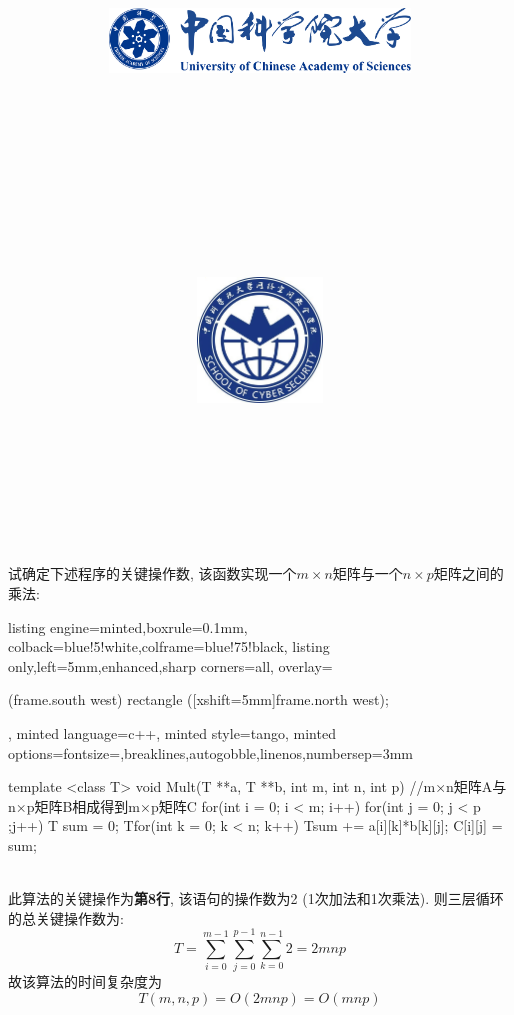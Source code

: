 \documentclass{article}
\title{
	\includegraphics[width=0.6\textwidth]{images/title/ucas_logo 1.pdf}\\
    \vspace{1in}
    \textmd{\textbf{\hmwkClass}}\\
	\textmd{\Large{\textbf{\hmwkClassID}}}\\
    \textmd{\textbf{\hmwkTitle}}\\
    \normalsize\vspace{0.1in}\large{\hmwkCompleteTime }\\
    \vspace{0.1in}\large{\textit{\hmwkClassInstructor\ }}\\
    \vspace{1in}
	\includegraphics[width=0.25\textwidth]{images/title/Cyber.jpg}\\
	\vspace{1in}
}
\author{
	\hmwkAuthorName \\ 
	\hmwkAuthorStuID \\
	\hmwkAuthorInst \\
	\hmwkAuthorzhuanye \\
	\hmwkAuthorfangxiang
	}
\date{}
\begin{document}
\maketitle


%
%
%
%
%


\pagebreak

\begin{homeworkProblem}
	试确定下述程序的关键操作数, 该函数实现一个$m\times n$矩阵与一个$n\times p$矩阵之间的乘法:
	
\begin{tcblisting}{listing engine=minted,boxrule=0.1mm,
	colback=blue!5!white,colframe=blue!75!black,
	listing only,left=5mm,enhanced,sharp corners=all,
	overlay={\begin{tcbclipinterior} (frame.south west)
	rectangle ([xshift=5mm]frame.north west);\end{tcbclipinterior}},
	minted language=c++,
	minted style=tango,
	minted options={fontsize=\normalsize,breaklines,autogobble,linenos,numbersep=3mm}}
    template <class T>
    void Mult(T **a, T **b, int m, int n, int p) {
        //m×n矩阵A与n×p矩阵B相成得到m×p矩阵C
        for(int i = 0; i < m; i++) {
            for(int j = 0; j < p ;j++) {
                T sum = 0;
                Tfor(int k = 0; k < n; k++)
                Tsum += a[i][k]*b[k][j];
                C[i][j] = sum;
            }
        }
    }
\end{tcblisting}
	
	
	\solution
	\\

	此算法的关键操作为\textbf{第8行}, 该语句的操作数为2 (1次加法和1次乘法). 则三层循环的总关键操作数为:$$T=\sum_{i=0}^{m-1}{\sum_{j=0}^{p-1}{\sum_{k=0}^{n-1}{2}}}=2mnp
	$$
	故该算法的时间复杂度为$$T\left( m,n,p \right) =O\left( 2mnp \right) =O\left( mnp \right) $$
	
\end{homeworkProblem}
\end{document}
